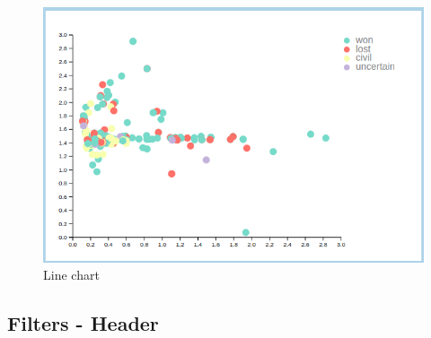 \begin{figure}[h]
\centering
\includegraphics[scale=0.30]{./images/scatter_plot.png}
\caption{Line chart}
\end{figure}

\subsection{Filters - Header}
